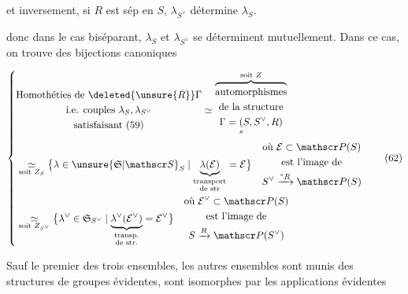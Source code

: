 et inversement, si $R$ est sép en $S$, $\lambda_{S^\vee}$ détermine $\lambda_S$.


donc dans le cas biséparant, $\lambda_S$ et $\lambda_{S^\vee}$ se déterminent mutuellement. Dans ce cas, on trouve des bijections canoniques

\[
\left\{\begin{aligned}
&\begin{gathered}\text{Homothéties de }\deleted{\unsure{R}}\Gamma\\
\text{i.e. couples }\lambda_S,\lambda_{S^\vee}\\\text{satisfaisant (59)}\end{gathered}
\simeq\overbrace{\begin{gathered}\text{automorphismes}\\\text{de la structure}\\
\Gamma=\underset{s}{(}S,S^\vee,R)\end{gathered}}^{\text{soit }Z}\\[3pt]
&\underset{\text{soit }Z_S}{\simeq}
\bigl\{\lambda\in\unsure{\mathfrak S|\mathscr S}_S\mid
\underbrace{\lambda(\mathcal E)}_{\substack{\text{transport}\\\text{de str}}}=\mathcal E\bigr\}
\quad\begin{gathered}\text{où }\mathcal E\subset\mathscr P(S)\\ \text{est l'image de}\\ S^\vee\xrightarrow{{}^sR}\mathscr P(S)\end{gathered}\\
&\underset{\text{soit }Z_{S^\vee}}{\simeq}
\bigl\{\lambda^\vee\in\mathfrak S_{S^\vee}\mid
\underbrace{\lambda^\vee(\mathcal E^\vee)}_{\substack{\text{transp.}\\\text{de str.}}}=\mathcal E^\vee\bigr\}
\quad\begin{gathered}\text{où }\mathcal E^\vee\subset\mathscr P(S)\\ \text{est l'image de}\\S\xrightarrow R\mathscr P(S^\vee)\end{gathered}
\end{aligned}\right. \tag*{(62)}
\]

Sauf le premier des trois  ensembles, les autres ensembles sont munis des structures de groupes évidentes,  sont isomorphes par les applications évidentes


